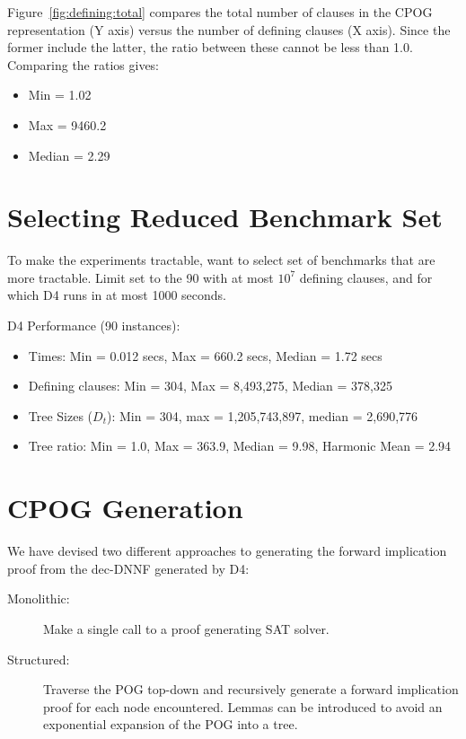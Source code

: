 \documentclass[twoside,11pt]{article}
\begin{document}
Figure~\ref{fig:defining:total} compares the total number of clauses in the CPOG representation (Y axis) versus the number of defining clauses (X axis).  Since the former include the latter, the ratio between these cannot be less than 1.0.
Comparing the ratios gives:
\begin{itemize}
\item Min = 1.02
\item Max = 9460.2
\item Median = 2.29
\end{itemize}



\section*{Selecting Reduced Benchmark Set}
       
To make the experiments tractable, want to select set of benchmarks that are more tractable.
Limit set to the 90 with at most $10^7$ defining clauses, and for which D4 runs in at most 1000 seconds.

D4 Performance (90 instances):
       \begin{itemize}
       \item Times: Min = 0.012 secs, Max = 660.2 secs, Median = 1.72 secs
       \item Defining clauses: Min = 304, Max = 8,493,275, Median = 378,325
       \item Tree Sizes ($D_t$): Min = 304, max = 1,205,743,897, median = 2,690,776
       \item Tree ratio: Min = 1.0, Max = 363.9, Median = 9.98, Harmonic Mean = 2.94
       \end{itemize}

\section*{CPOG Generation}

We have devised two different approaches to generating the forward implication proof from the dec-DNNF generated by {\sc D4}:
\begin{description}
\item[Monolithic:] Make a single call to a proof generating SAT solver.
\item[Structured:] Traverse the POG top-down and recursively generate a forward implication proof for each node encountered.  Lemmas can be introduced to avoid an exponential expansion of the POG into a tree.
\end{description}
\end{document}
